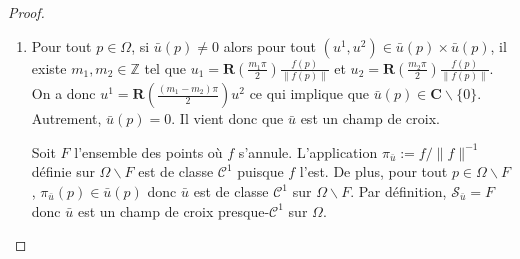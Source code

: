 \begin{proof}
\[\]
\vspace{-1cm}
\begin{enumerate}
\item Pour tout $p\in\Omega$, si $\bar{u}(p)\neq 0$ alors pour tout $(u^1, u^2)\in\bar{u}(p)\times\bar{u}(p)$, il existe $m_1,m_2\in\mathbb{Z}$ tel que $u_1=\mathbf{R}(\frac{m_1\pi}{2})\frac{f(p)}{\left\|f(p)\right\|}$ et $u_2=\mathbf{R}(\frac{m_2\pi}{2})\frac{f(p)}{\left\|f(p)\right\|}$. On a donc $u^1=\mathbf{R}(\frac{(m_1-m_2)\pi}{2})u^2$ ce qui implique que $\bar{u}(p)\in\mathbf{C}\backslash\{0\}$. Autrement, $\bar{u}(p)=0$. Il vient donc que $\bar{u}$ est un champ de croix.

Soit $F$ l'ensemble des points où $f$ s'annule. L'application $\pi_{\bar{u}}:=f/\|f\|^{-1}$ définie sur $\Omega\backslash F$ est de classe $\mathcal{C}^1$ puisque $f$ l'est. De plus, pour tout $p\in\Omega\backslash F$, $\pi_{\bar{u}}(p)\in\bar{u}(p)$ donc $\bar{u}$ est de classe $\mathcal{C}^1$ sur $\Omega\backslash F$. Par définition, $\mathcal{S}_{\bar{u}}=F$ donc $\bar{u}$ est un champ de croix presque-$\mathcal{C}^1$ sur $\Omega$.\\


\end{enumerate}
\end{proof}
